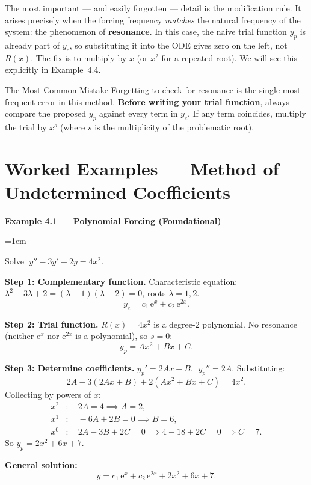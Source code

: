 \documentclass[12pt,a4paper]{article}
\newenvironment{example}[1]{%
  \vspace{0.8em}
  \noindent{\footnotesize\scshape\color{orange!50!black} Example}\par
  \noindent\textbf{#1}\par\vspace{0.3em}
  \begin{list}{}{\leftmargin=1em\rightmargin=0pt}\item
}{%
  \end{list}\vspace{0.8em}
}
\newcommand{\ee}{\mathrm{e}}
\begin{document}
The most important --- and easily forgotten --- detail is the modification rule.
It arises precisely when the forcing frequency \emph{matches} the natural frequency
of the system: the phenomenon of \textbf{resonance}. In this case, the naive trial
function $y_p$ is already part of $y_c$, so substituting it into the ODE gives
zero on the left, not $R(x)$. The fix is to multiply by $x$ (or $x^2$ for a
repeated root). We will see this explicitly in Example~4.4.

\begin{warningbox}{The Most Common Mistake}
Forgetting to check for resonance is the single most frequent error in this method.
\textbf{Before writing your trial function}, always compare the proposed $y_p$ against
every term in $y_c$. If any term coincides, multiply the trial by $x^s$ (where $s$
is the multiplicity of the problematic root).
\end{warningbox}

\section{Worked Examples --- Method of Undetermined Coefficients}

\begin{example}{Example 4.1 --- Polynomial Forcing (Foundational)}
Solve $\;y'' - 3y' + 2y = 4x^2$.

\medskip
\textbf{Step 1: Complementary function.}
Characteristic equation: $\lambda^2 - 3\lambda + 2 = (\lambda-1)(\lambda-2)=0$,
roots $\lambda = 1, 2$.
\[
  y_c = c_1\,\ee^{x} + c_2\,\ee^{2x}.
\]

\textbf{Step 2: Trial function.} $R(x) = 4x^2$ is a degree-2 polynomial.
No resonance (neither $\ee^x$ nor $\ee^{2x}$ is a polynomial), so $s=0$:
\[
  y_p = Ax^2 + Bx + C.
\]

\textbf{Step 3: Determine coefficients.}
$y_p' = 2Ax+B$, $\;y_p'' = 2A$. Substituting:
\[
  2A - 3(2Ax+B) + 2(Ax^2+Bx+C) = 4x^2.
\]
Collecting by powers of $x$:
\begin{align*}
  x^2 &: \quad 2A = 4 \implies A = 2,\\
  x^1 &: \quad -6A + 2B = 0 \implies B = 6,\\
  x^0 &: \quad 2A - 3B + 2C = 0 \implies 4 - 18 + 2C = 0 \implies C = 7.
\end{align*}
So $y_p = 2x^2 + 6x + 7$.

\textbf{General solution:}
\[
  \boxed{y = c_1\,\ee^x + c_2\,\ee^{2x} + 2x^2 + 6x + 7.}
\]
\end{example}
\end{document}
